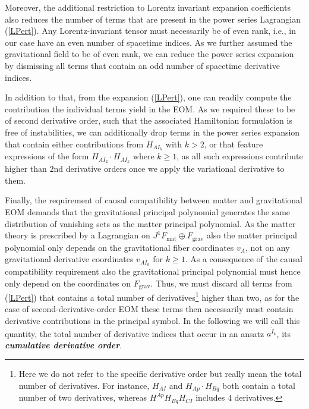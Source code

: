 Moreover, the additional restriction to Lorentz invariant expansion coefficients also reduces the number of terms that are present in the power series Lagrangian (\ref{LPert}). Any Lorentz-invariant tensor must necessarily be of even rank, i.e., in our case have an even number of spacetime indices. As we further assumed the gravitational field to be of even rank, we can reduce the power series expansion by dismissing all terms that contain an odd number of spacetime derivative indices.

In addition to that, from the expansion (\ref{LPert}), one can readily compute the contribution the individual terms yield in the EOM.  As we required these to be of second derivative order, such that the associated Hamiltonian formulation is free of instabilities, we can additionally drop terms in the power series expansion that contain either contributions from $H_{AI_k}$ with $k>2$, or that feature expressions of the form $H_{AI_2}\cdot H_{AI_k}$ where $k\geq 1$, as all such expressions contribute higher than $2$nd derivative orders once we apply the variational derivative to them.

Finally, the requirement of causal compatibility between matter and gravitational EOM demands that the gravitational principal polynomial generates the same distribution of vanishing sets as the matter principal polynomial. As the matter theory is prescribed by a Lagrangian on $J^1F_{\text{mat}} \oplus F_{\text{grav}}$ also the matter principal polynomial only depends on the gravitational fiber coordinates $v_A$, not on any gravitational derivative coordinates $v_{AI_k}$ for $k\geq 1$.
As a consequence of the causal compatibility requirement also the gravitational principal polynomial must hence only depend on the coordinates on $F_{\text{grav}}$. Thus, we must discard all terms from (\ref{LPert}) that contains a total number of derivatives\footnote{Here we do not refer to the specific derivative order but really mean the total number of derivatives. For instance, $H_{AI}$ and $H_{Ap} \cdot H_{Bq}$ both contain a total number of two derivatives, whereas $H^{Ap}H_{Bq}H_{CI}$ includes $4$ derivatives.} higher than two, as for the case of second-derivative-order EOM these terms then necessarily must contain derivative contributions in the principal symbol.
In the following we will call this quantity, the total number of derivative indices that occur in an ansatz $a^{\tilde{I}_k}$, its \textit{\textbf{cumulative derivative order}}.  

